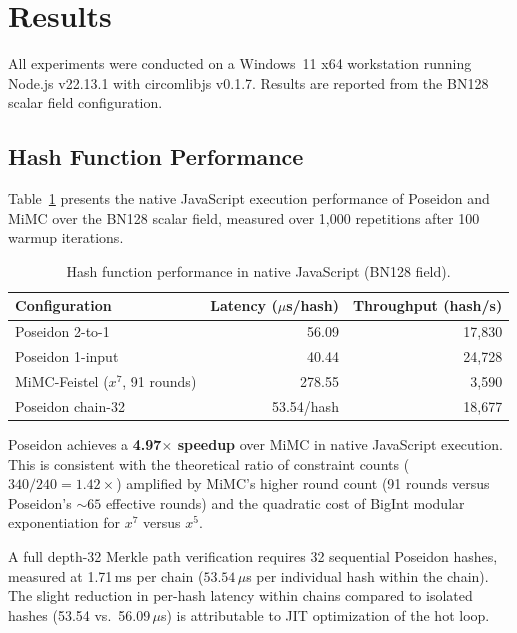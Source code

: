 
\section{Results}
\label{sec:results}

All experiments were conducted on a Windows~11 x64 workstation running Node.js v22.13.1 with circomlibjs v0.1.7. Results are reported from the BN128 scalar field configuration.

\subsection{Hash Function Performance}

Table~\ref{tab:hash-performance} presents the native JavaScript execution performance of Poseidon and MiMC over the BN128 scalar field, measured over 1{,}000 repetitions after 100 warmup iterations.

\begin{table}[htbp]
\centering
\caption{Hash function performance in native JavaScript (BN128 field).}
\label{tab:hash-performance}
\begin{tabular}{lrr}
\hline
\textbf{Configuration} & \textbf{Latency ($\mu$s/hash)} & \textbf{Throughput (hash/s)} \\
\hline
Poseidon 2-to-1 & 56.09 & 17{,}830 \\
Poseidon 1-input & 40.44 & 24{,}728 \\
MiMC-Feistel ($x^7$, 91 rounds) & 278.55 & 3{,}590 \\
Poseidon chain-32 & 53.54/hash & 18{,}677 \\
\hline
\end{tabular}
\end{table}

Poseidon achieves a \textbf{4.97$\times$ speedup} over MiMC in native JavaScript execution. This is consistent with the theoretical ratio of constraint counts ($340/240 = 1.42\times$) amplified by MiMC's higher round count (91 rounds versus Poseidon's ${\sim}65$ effective rounds) and the quadratic cost of BigInt modular exponentiation for $x^7$ versus $x^5$.

A full depth-32 Merkle path verification requires 32 sequential Poseidon hashes, measured at 1.71\,ms per chain ($53.54\,\mu$s per individual hash within the chain). The slight reduction in per-hash latency within chains compared to isolated hashes (53.54 vs.\ 56.09\,$\mu$s) is attributable to JIT optimization of the hot loop.

